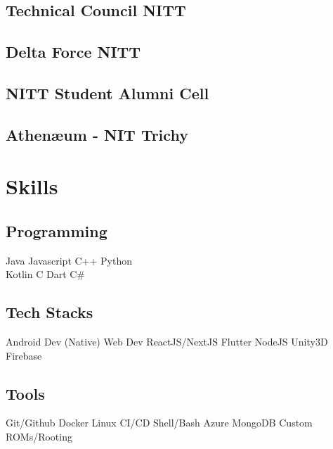 \documentclass[]{deedy-resume-openfont}
\begin{document}
\begin{minipage}[t]{0.3\textwidth}
\subsection{Technical Council NITT}
\sectionsep

\subsection{Delta Force NITT}
\sectionsep

\subsection{NITT Student Alumni Cell}
\sectionsep

\subsection{Athenæum - NIT Trichy}


\section{Skills}

\subsection{Programming}
Java  \textbullet{} Javascript C++ \textbullet{} Python  \\
Kotlin \textbullet{} C \textbullet{} Dart \textbullet{} C\# \\ 
\sectionsep

\subsection{Tech Stacks}
Android Dev (Native) \textbullet{}   Web Dev  ReactJS/NextJS  \textbullet{} Flutter  \textbullet{} NodeJS Unity3D \textbullet{} Firebase 
\sectionsep

\subsection{Tools}
Git/Github  \textbullet{} Docker \textbullet{} Linux \textbullet{} CI/CD
\textbullet{} Shell/Bash \textbullet{} Azure \textbullet{} MongoDB \textbullet{}
Custom ROMs/Rooting \\ 

%
%

\end{minipage} 
\end{document}
